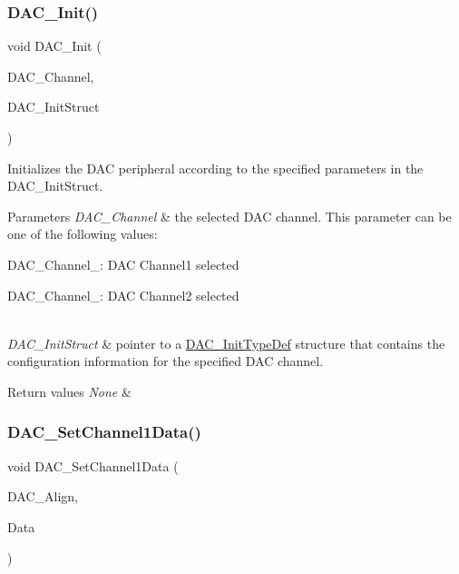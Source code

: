 \subsubsection{\texorpdfstring{DAC\_Init()}{DAC\_Init()}}
{\footnotesize\ttfamily void D\+A\+C\+\_\+\+Init (\begin{DoxyParamCaption}\item[{uint32\+\_\+t}]{D\+A\+C\+\_\+\+Channel,  }\item[{\mbox{\hyperlink{struct_d_a_c___init_type_def}{D\+A\+C\+\_\+\+Init\+Type\+Def}} $\ast$}]{D\+A\+C\+\_\+\+Init\+Struct }\end{DoxyParamCaption})}



Initializes the D\+AC peripheral according to the specified parameters in the D\+A\+C\+\_\+\+Init\+Struct. 


\begin{DoxyParams}{Parameters}
{\em D\+A\+C\+\_\+\+Channel} & the selected D\+AC channel. This parameter can be one of the following values\+: \begin{DoxyItemize}
\item D\+A\+C\+\_\+\+Channel\+\_\+: D\+AC Channel1 selected \item D\+A\+C\+\_\+\+Channel\+\_\+: D\+AC Channel2 selected \end{DoxyItemize}
\\
\hline
{\em D\+A\+C\+\_\+\+Init\+Struct} & pointer to a \mbox{\hyperlink{struct_d_a_c___init_type_def}{D\+A\+C\+\_\+\+Init\+Type\+Def}} structure that contains the configuration information for the specified D\+AC channel. \\
\hline
\end{DoxyParams}

\begin{DoxyRetVals}{Return values}
{\em None} & \\
\hline
\end{DoxyRetVals}
\mbox{\label{group___d_a_c___private___functions_gad06b4230d2b17d1d13f41dce4c782461}} 
\subsubsection{\texorpdfstring{DAC\_SetChannel1Data()}{DAC\_SetChannel1Data()}}
{\footnotesize\ttfamily void D\+A\+C\+\_\+\+Set\+Channel1\+Data (\begin{DoxyParamCaption}\item[{uint32\+\_\+t}]{D\+A\+C\+\_\+\+Align,  }\item[{uint16\+\_\+t}]{Data }\end{DoxyParamCaption})}



